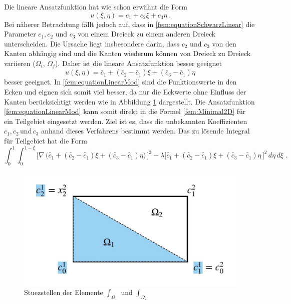 Die lineare Ansatzfunktion hat wie schon erwähnt die Form
\begin{equation}
u(\xi, \eta) = c_1 + c_2 \xi + c_3 \eta \, .
\label{fem:equationSchwarzLinear}
\end{equation}
Bei näherer Betrachtung fällt jedoch auf, dass in \eqref{fem:equationSchwarzLinear} die Parameter $c_1, c_2$ und $c_3$ von einem Dreieck zu einem anderen Dreieck unterscheiden. Die Ursache liegt insbesondere darin, dass $c_2$ und $c_3$ von den Kanten abhängig sind und die Kanten wiederum können von Dreieck zu Dreieck variieren ($\Omega_i$, $\Omega_j$). Daher ist die lineare Ansatzfunktion besser geeignet
\begin{equation}
u(\xi, \eta) = \tilde{c_1} + (\tilde{c_2} -\tilde{c_1})\xi + (\tilde{c_3} - \tilde{c_1})\eta
\label{fem:equationLinearMod}
\end{equation}
besser geeignet. In \eqref{fem:equationLinearMod} sind die Funktionswerte in den Ecken und eignen sich somit viel besser, da nur die Eckwerte ohne Einfluss der Kanten berücksichtigt werden wie in Abbildung \ref{fem:Stuestellen} dargestellt. Die Ansatzfunktion \eqref{fem:equationLinearMod} kann somit direkt in die Formel \eqref{fem:Minimal2D} für ein Teilgebiet eingesetzt werden. Ziel ist es, dass die unbekannten Koeffizienten $c_1, c_2 \, $und$ \, c_3$ anhand dieses Verfahrens bestimmt werden. Das zu lösende Integral für Teilgebiet hat die Form
\begin{equation}
\int_0^1 \int_0^{1 - \xi} \bigl[ \nabla \, \bigl( \tilde{c_1} + (\tilde{c_2} - \tilde{c_1})\xi + (\tilde{c_3} - \tilde{c_1})\eta \bigr) \, \bigr]^2 - \lambda \bigl[\tilde{c_1} + (\tilde{c_2} - \tilde{c_1})\xi + (\tilde{c_3} -\tilde{c_1})\eta \, \bigr]^2 \, d \eta \, d \xi \; .
\label{fem:FlaecheDreieck}
\end{equation}
\begin{figure}[h]
	\centering
	\includegraphics[scale=0.8]{papers/fem/Images/Stuezstellen.jpeg}
	\caption{Stuezstellen der Elemente $\int_{\Omega_1}$ und $\int_{\Omega_2}$ }
	\label{fem:Stuestellen}
\end{figure} 
